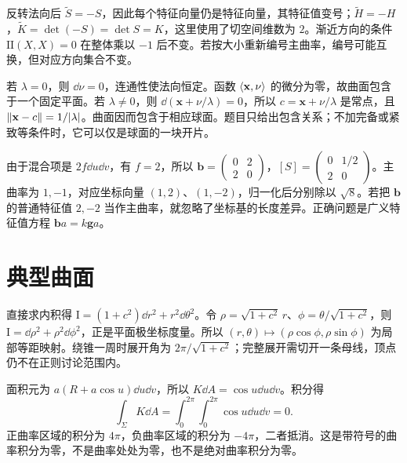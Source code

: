 \begin{solve}
反转法向后 $\widetilde S=-S$，因此每个特征向量仍是特征向量，其特征值变号；$\widetilde H=-H$，$\widetilde K=\det(-S)=\det S=K$，这里使用了切空间维数为 $2$。渐近方向的条件 $\mathrm{II}(X,X)=0$ 在整体乘以 $-1$ 后不变。若按大小重新编号主曲率，编号可能互换，但对应方向集合不变。
\end{solve}

\begin{solve}
若 $\lambda=0$，则 $\dd\nu=0$，连通性使法向恒定。函数 $\langle \mathbf x,\nu\rangle$ 的微分为零，故曲面包含于一个固定平面。若 $\lambda\ne0$，则 $\dd(\mathbf x+\nu/\lambda)=0$，所以 $c=\mathbf x+\nu/\lambda$ 是常点，且 $\lVert \mathbf x-c\rVert=1/|\lambda|$。曲面因而包含于相应球面。题目只给出包含关系；不加完备或紧致等条件时，它可以仅是球面的一块开片。
\end{solve}

\begin{solve}
由于混合项是 $2f\dd u\dd v$，有 $f=2$，所以 $\mathbf b=\begin{pmatrix}0&2\\2&0\end{pmatrix}$，$[S]=\begin{pmatrix}0&1/2\\2&0\end{pmatrix}$。主曲率为 $1,-1$，对应坐标向量 $(1,2)$、$(1,-2)$，归一化后分别除以 $\sqrt8$。若把 $\mathbf b$ 的普通特征值 $2,-2$ 当作主曲率，就忽略了坐标基的长度差异。正确问题是广义特征值方程 $\mathbf b a=k\mathbf g a$。
\end{solve}

\section{典型曲面}
\begin{solve}
直接求内积得 $\mathrm I=(1+c^2)\dd r^2+r^2\dd\theta^2$。令 $\rho=\sqrt{1+c^2}\,r$、$\phi=\theta/\sqrt{1+c^2}$，则 $\mathrm I=\dd\rho^2+\rho^2\dd\phi^2$，正是平面极坐标度量。所以 $(r,\theta)\mapsto(\rho\cos\phi,\rho\sin\phi)$ 为局部等距映射。绕锥一周时展开角为 $2\pi/\sqrt{1+c^2}$；完整展开需切开一条母线，顶点仍不在正则讨论范围内。
\end{solve}

\begin{solve}
面积元为 $a(R+a\cos u)\dd u\dd v$，所以 $K\dd A=\cos u\dd u\dd v$。积分得
\[
 \int_\Sigma K\dd A=\int_0^{2\pi}\int_0^{2\pi}\cos u\dd u\dd v=0.
\]
正曲率区域的积分为 $4\pi$，负曲率区域的积分为 $-4\pi$，二者抵消。这是带符号的曲率积分为零，不是曲率处处为零，也不是绝对曲率积分为零。
\end{solve}

